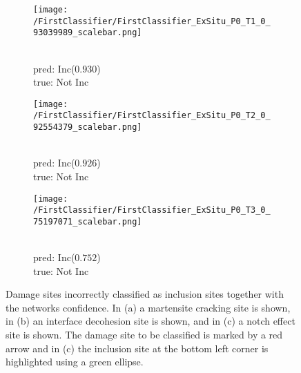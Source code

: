 

\begin{figure}[H]
\centering
\begin{subfigure}{.3\textwidth}
\texttt{[image: /FirstClassifier/FirstClassifier\_ExSitu\_P0\_T1\_0\_93039989\_scalebar.png]}
\caption{\\pred: Inc($0.930$) \\true: Not Inc}
\label{sub:MasInc}
\end{subfigure}
\centering
\begin{subfigure}{.3\textwidth}
\texttt{[image: /FirstClassifier/FirstClassifier\_ExSitu\_P0\_T2\_0\_92554379\_scalebar.png]}
\caption{\\pred: Inc($0.926$) \\true: Not Inc}
\label{sub:IDasInc1}
\end{subfigure}
\centering
\begin{subfigure}{.3\textwidth}
\texttt{[image: /FirstClassifier/FirstClassifier\_ExSitu\_P0\_T3\_0\_75197071\_scalebar.png]}
\caption{\\pred: Inc($0.752$) \\true: Not Inc}
\label{sub:IDasInc2}
\end{subfigure}
\caption{Damage sites incorrectly classified as inclusion sites together with the networks confidence. In (a) a martensite cracking site is shown, in (b) an interface decohesion site is shown, and in (c) a notch effect site is shown. The damage site to be classified is marked by a red arrow and in (c) the inclusion site at the bottom left corner is highlighted using a green ellipse.}
\label{fig:InceptionExSituPredictedIncTrueRest}
\end{figure}


